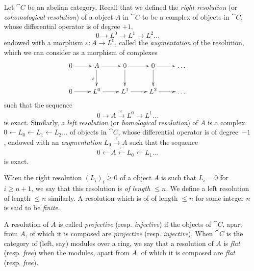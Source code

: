\begin{env}[11.4.1]
\label{0.11.4.1}
Let $\cat{C}$ be an abelian category.
Recall that we defined the \emph{right resolution} (or \emph{cohomological resolution}) of a object $A$ in $\cat{C}$ to be a complex of objects in $\cat{C}$, whose differential operator is of degree $+1$,
\[
  0 \rightarrow L^0 \rightarrow L^1 \rightarrow L^2 \ldots
\]
endowed with a morphism $\varepsilon: A \rightarrow L^0$, called the \emph{augmentation} of the resolution, which we can consider as a morphism of complexes
\[
  \xymatrix{
    0 \ar[r]
    & A \ar[r] \ar[d]_{\varepsilon}
    & 0 \ar[r] \ar[d]
    & 0 \ar[r] \ar[d]
    & \ldots
  \\0 \ar[r]
    & L^0 \ar[r]
    & L^1 \ar[r]
    & L^2 \ar[r]
    & \ldots
  }
\]
such that the sequence
\[
  0 \rightarrow A \xrightarrow{\varepsilon} L^0 \rightarrow L^1 \ldots
\]
is exact.
Similarly, a \emph{left resolution} (or \emph{homological resolution}) of $A$ is a complex $0 \leftarrow L_0 \leftarrow L_1 \leftarrow L_2 \ldots$ of objects in $\cat{C}$, whose differential operator is of degree~$-1$, endowed with an \emph{augmentation} $L_0 \xrightarrow{\varepsilon} A$ such that the sequence
\[
  0 \leftarrow A \xleftarrow{\varepsilon} L_0 \leftarrow L_1 \ldots
\]
is exact.

When the right resolution $(L_i)_i\geq 0$ of a object $A$ is such that $L_i=0$ for $i\geq n+1$, we say that this resolution is \emph{of length $\leq n$}.
We define a left resolution of length $\leq n$ similarly.
A resolution which is of of length $\leq n$ for some integer $n$ is said to be \emph{finite}.

A resolution of $A$ is called \emph{projective} (resp. \emph{injective}) if the objects of $\cat{C}$, apart from $A$, of which it is composed are \emph{projective} (resp. \emph{injective}). 
When $\cat{C}$ is the category of (left, say) modules over a ring, we say that a resolution of $A$ is \emph{flat} (resp. \emph{free}) when the modules, apart from $A$, of which it is composed are \emph{flat} (resp. \emph{free}).
\end{env}


